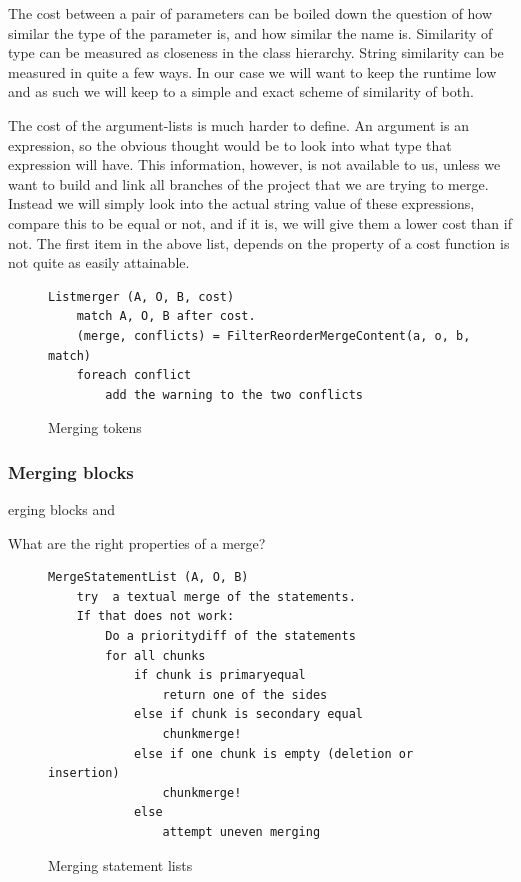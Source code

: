 \documentclass[11pt]{article}
\begin{document}
The cost between a pair of parameters can be boiled down the question of how similar the type of the parameter is, and how similar the name is. Similarity of type can be measured as closeness in the class hierarchy. String similarity can be measured in quite a few ways. In our case we will want to keep the runtime low and as such we will keep to a simple and exact scheme of similarity of both.

The cost of the argument-lists is much harder to define. An argument is an expression, so the obvious thought would be to look into what type that expression will have. This information, however, is not available to us, unless we want to build and link all branches of the project that we are trying to merge. Instead we will simply look into the actual string value of these expressions, compare this to be equal or not, and if it is, we will give them a lower cost than if not.
The first item in the above list, depends on the property of a cost function is not quite as easily attainable. 


\begin{figure}
  \caption{Merging tokens}
  \label{Listmerger}
\begin{verbatim}
Listmerger (A, O, B, cost)
    match A, O, B after cost.
    (merge, conflicts) = FilterReorderMergeContent(a, o, b, match)
    foreach conflict
        add the warning to the two conflicts

\end{verbatim}
\end{figure}

\subsubsection{Merging blocks}
erging blocks and 


What are the right properties of a merge?

\begin{figure}
  \caption{Merging statement lists}
  \label{MergeStatementList}
\begin{verbatim}
MergeStatementList (A, O, B)
    try  a textual merge of the statements.
    If that does not work:
        Do a prioritydiff of the statements
        for all chunks
            if chunk is primaryequal
                return one of the sides
            else if chunk is secondary equal
                chunkmerge!
            else if one chunk is empty (deletion or insertion)
                chunkmerge!
            else 
                attempt uneven merging

\end{verbatim}
\end{figure}
\end{document}
